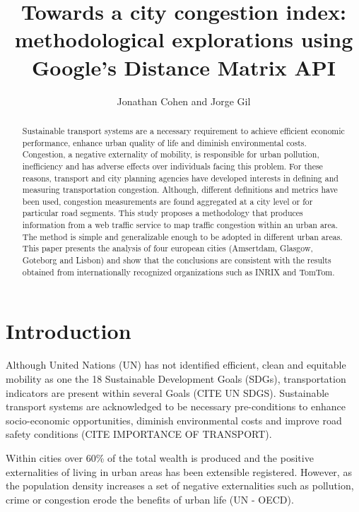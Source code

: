 \documentclass[a4paper]{jpconf}
\begin{document}
\title{Towards a city congestion index: methodological explorations using Google's Distance Matrix API}

\author{Jonathan Cohen and Jorge Gil}

\address{Chalmers University of Technology, Sven Hultins gata 6, SE-412 96, Göteborg, Sweden}





\begin{abstract}
	Sustainable transport systems are a necessary requirement to achieve efficient economic performance, enhance urban quality of life and diminish environmental costs. Congestion, a negative externality of mobility, is responsible for urban pollution, inefficiency and has adverse effects over individuals facing this problem. For these reasons, transport and city planning agencies have developed interests in defining and measuring transportation congestion. Although, different definitions and metrics have been used, congestion measurements are found aggregated at a city level or for particular road segments. This study proposes a methodology that produces information from a web traffic service to map traffic congestion within an urban area. The method is simple and generalizable enough to be adopted in different urban areas. This paper presents the analysis of four european cities (Amsertdam, Glasgow, Goteborg and Lisbon) and show that the conclusions are consistent with the results obtained from internationally recognized organizations such as INRIX and TomTom.
\end{abstract}


\section{Introduction}%
\indent Although United Nations (UN) has not identified  efficient, clean and equitable mobility as one the 18 Sustainable Development Goals (SDGs), transportation indicators are present within several Goals (CITE UN SDGS). Sustainable transport systems are acknowledged to be necessary pre-conditions to enhance socio-economic opportunities, diminish environmental costs and improve road safety conditions (CITE IMPORTANCE OF TRANSPORT). \par
\indent Within cities over 60\% of the total wealth is produced and the positive externalities of living in urban areas has been extensible registered. However, as the population density increases a set of negative externalities such as pollution, crime or congestion erode the benefits of urban life (UN - OECD). \par
\end{document}

